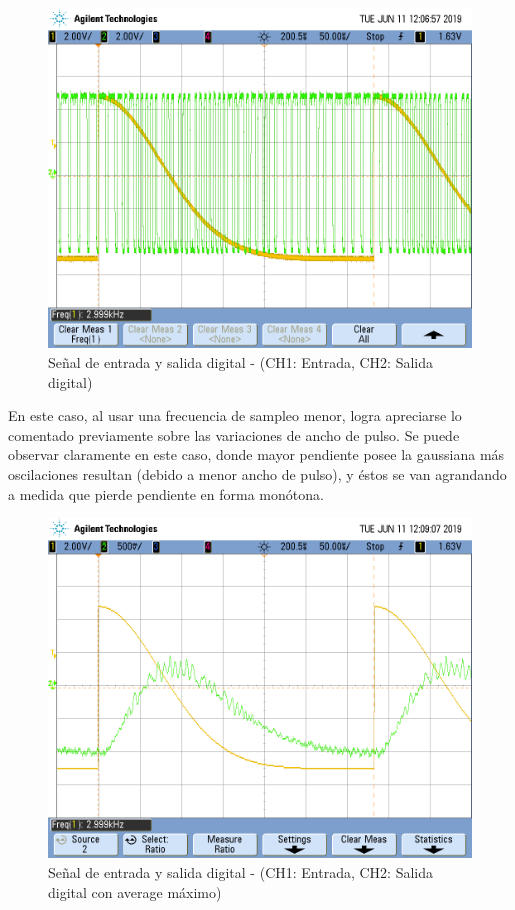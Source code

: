 \documentclass[assd_tp3_main.tex]{subfiles}
\begin{document}
\begin{figure}[!ht]
\begin{centering}
\includegraphics[scale=0.25]{../EJ4/Mediciones/0.5Gauss/s2_3.png}
\par\end{centering}
\caption{Señal de entrada y salida digital - (CH1: Entrada, CH2: Salida digital)}
\end{figure}

En este caso, al usar una frecuencia de sampleo menor, logra apreciarse lo comentado previamente sobre las variaciones de ancho de pulso. Se puede observar claramente en este caso, donde mayor pendiente posee la gaussiana más oscilaciones resultan (debido a menor ancho de pulso), y éstos se van agrandando a medida que pierde pendiente en forma monótona.
\newpage
\begin{figure}[!ht]
\begin{centering}
\includegraphics[scale=0.25]{../EJ4/Mediciones/0.5Gauss/s2_4.png}
\par\end{centering}
\caption{Señal de entrada y salida digital - (CH1: Entrada, CH2: Salida digital con average máximo)}
\end{figure}
\end{document}
